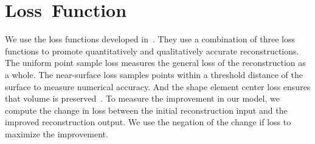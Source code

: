 \section{Loss~Function}
\label{sec:loss_function}

We use the loss functions developed in~\cite{Genova2019, Genova2020}. They use a combination of three loss functions to promote quantitatively and qualitatively accurate reconstructions. The uniform point sample loss measures the general loss of the reconstruction as a whole. The near-surface loss samples points within a threshold distance of the surface to measure numerical accuracy. And the shape element center loss ensures that volume is preserved~\cite{Genova2019}. To measure the improvement in our model, we compute the change in loss between the initial reconstruction input and the improved reconstruction output. We use the negation of the change if loss to maximize the improvement.
